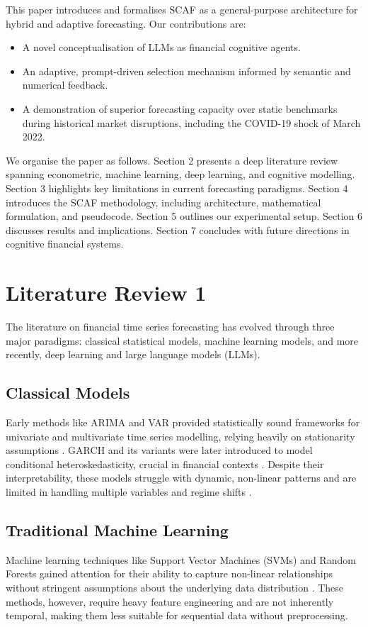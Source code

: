 \documentclass[conference]{IEEEtran}
\begin{document}
This paper introduces and formalises SCAF as a general-purpose architecture for hybrid and adaptive forecasting. Our contributions are:
\begin{itemize}
  \item A novel conceptualisation of LLMs as financial cognitive agents.
  \item An adaptive, prompt-driven selection mechanism informed by semantic and numerical feedback.
  \item A demonstration of superior forecasting capacity over static benchmarks during historical market disruptions, including the COVID-19 shock of March 2022.
\end{itemize}

We organise the paper as follows. Section 2 presents a deep literature review spanning econometric, machine learning, deep learning, and cognitive modelling. Section 3 highlights key limitations in current forecasting paradigms. Section 4 introduces the SCAF methodology, including architecture, mathematical formulation, and pseudocode. Section 5 outlines our experimental setup. Section 6 discusses results and implications. Section 7 concludes with future directions in cognitive financial systems.
\section{Literature Review 1}

The literature on financial time series forecasting has evolved through three major paradigms: classical statistical models, machine learning models, and more recently, deep learning and large language models (LLMs).

\subsection{Classical Models}
Early methods like ARIMA and VAR provided statistically sound frameworks for univariate and multivariate time series modelling, relying heavily on stationarity assumptions \cite{box1970time}. GARCH and its variants were later introduced to model conditional heteroskedasticity, crucial in financial contexts \cite{bollerslev1986garch}. Despite their interpretability, these models struggle with dynamic, non-linear patterns and are limited in handling multiple variables and regime shifts \cite{bai1998bai}.

\subsection{Traditional Machine Learning}
Machine learning techniques like Support Vector Machines (SVMs) and Random Forests gained attention for their ability to capture non-linear relationships without stringent assumptions about the underlying data distribution \cite{breiman2001randomforest}. These methods, however, require heavy feature engineering and are not inherently temporal, making them less suitable for sequential data without preprocessing.
\end{document}
